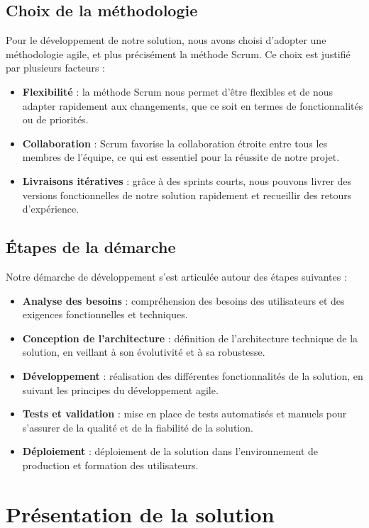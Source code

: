 \documentclass[12pt,a4paper]{report}
\begin{document}
\section{Choix de la méthodologie}
Pour le développement de notre solution, nous avons choisi d'adopter une méthodologie agile, et plus précisément la méthode Scrum. Ce choix est justifié par plusieurs facteurs :
\begin{itemize}
    \item \textbf{Flexibilité} : la méthode Scrum nous permet d'être flexibles et de nous adapter rapidement aux changements, que ce soit en termes de fonctionnalités ou de priorités.
    \item \textbf{Collaboration} : Scrum favorise la collaboration étroite entre tous les membres de l'équipe, ce qui est essentiel pour la réussite de notre projet.
    \item \textbf{Livraisons itératives} : grâce à des sprints courts, nous pouvons livrer des versions fonctionnelles de notre solution rapidement et recueillir des retours d'expérience.
\end{itemize}

\section{Étapes de la démarche}
Notre démarche de développement s'est articulée autour des étapes suivantes :
\begin{itemize}
    \item \textbf{Analyse des besoins} : compréhension des besoins des utilisateurs et des exigences fonctionnelles et techniques.
    \item \textbf{Conception de l'architecture} : définition de l'architecture technique de la solution, en veillant à son évolutivité et à sa robustesse.
    \item \textbf{Développement} : réalisation des différentes fonctionnalités de la solution, en suivant les principes du développement agile.
    \item \textbf{Tests et validation} : mise en place de tests automatisés et manuels pour s'assurer de la qualité et de la fiabilité de la solution.
    \item \textbf{Déploiement} : déploiement de la solution dans l'environnement de production et formation des utilisateurs.
\end{itemize}

\chapter{Présentation de la solution}
\end{document}
